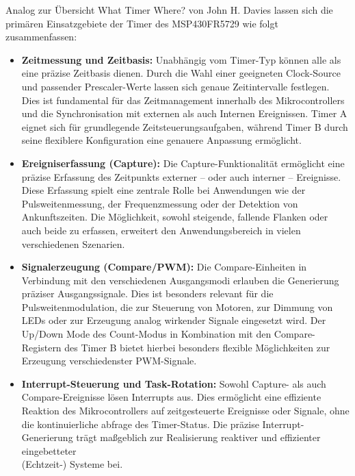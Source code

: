 \newpage
Analog zur \"Ubersicht \glqq What Timer Where?\grqq{} von John H. Davies lassen sich die prim\"aren Einsatzgebiete der Timer des MSP430FR5729 wie folgt zusammenfassen: 

\begin{itemize}
	\item \textbf{Zeitmessung und Zeitbasis:} Unabh\"angig vom Timer-Typ k\"onnen alle als eine pr\"azise Zeitbasis dienen. Durch die Wahl einer geeigneten Clock-Source und passender Prescaler-Werte lassen sich genaue Zeitintervalle festlegen. Dies ist fundamental f\"ur das Zeitmanagement innerhalb des Mikrocontrollers und die Synchronisation mit externen als auch Internen Ereignissen. Timer A eignet sich f\"ur grundlegende Zeitsteuerungsaufgaben, w\"ahrend Timer B durch seine flexiblere Konfiguration eine genauere Anpassung erm\"oglicht.

	\item \textbf{Ereigniserfassung (Capture):} Die Capture-Funktionalit\"at erm\"oglicht eine pr\"azise Erfassung des Zeitpunkts externer -- oder \ggf auch interner -- Ereignisse. Diese Erfassung spielt eine zentrale Rolle bei Anwendungen wie der Pulsweitenmessung, der Frequenzmessung oder der Detektion von Ankunftszeiten. Die M\"oglichkeit, sowohl steigende, fallende Flanken oder auch beide zu erfassen, erweitert den Anwendungsbereich in vielen verschiedenen Szenarien.

	\item \textbf{Signalerzeugung (Compare/PWM):} Die Compare-Einheiten in Verbindung mit den verschiedenen Ausgangsmodi erlauben die Generierung pr\"aziser Ausgangssignale. Dies ist besonders relevant f\"ur die Pulsweitenmodulation, die zur Steuerung von Motoren, zur Dimmung von LEDs oder zur Erzeugung analog wirkender Signale eingesetzt wird. Der Up/Down Mode des Count-Modus in Kombination mit den Compare-Registern des Timer B bietet hierbei besonders flexible M\"oglichkeiten zur Erzeugung verschiedenster PWM-Signale.

	\item \textbf{Interrupt-Steuerung und Task-Rotation:} Sowohl Capture- als auch \\Compare-Ereignisse l\"osen Interrupts aus. Dies erm\"oglicht eine effiziente Reaktion des Mikrocontrollers auf zeitgesteuerte Ereignisse oder Signale, ohne die kontinuierliche abfrage des Timer-Status. Die pr\"azise Interrupt-Generierung tr\"agt ma{\ss}geblich zur Realisierung reaktiver und effizienter eingebetteter \\(Echtzeit-) Systeme bei.
\end{itemize}

